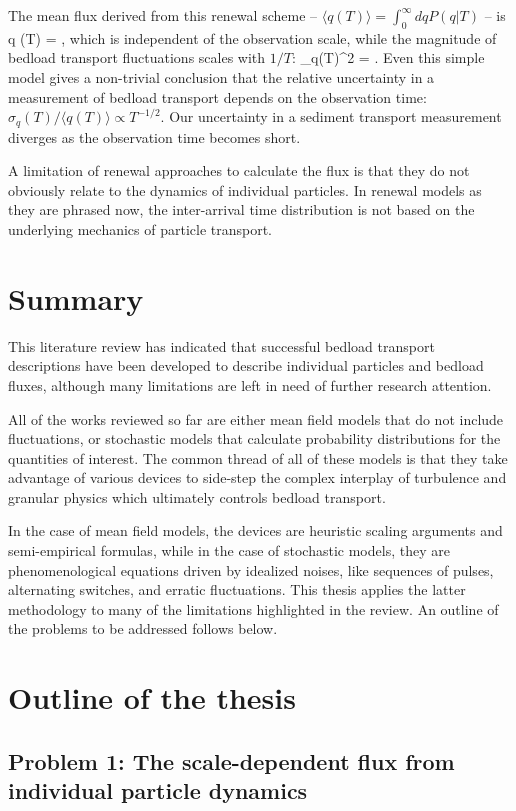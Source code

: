 The mean flux derived from this renewal scheme -- $\langle q (T)\rangle = \int_0^\infty dq P(q|T)$ -- is
\be \langle q (T) \rangle = \Lambda, \ee
which is independent of the observation scale, while the magnitude of bedload transport fluctuations scales with $1/T$: 
\be \sigma_q(T)^2 = .\ee
Even this simple model gives a non-trivial conclusion that the relative uncertainty in a measurement of bedload transport depends on the observation time: $\sigma_q(T)/\langle q(T) \rangle \propto T^{-1/2}.$ Our uncertainty in a sediment transport measurement diverges as the observation time becomes short.

A limitation of renewal approaches to calculate the flux is that they do not obviously relate to the dynamics of individual particles. In renewal models as they are phrased now, the inter-arrival time distribution is not based on the underlying mechanics of particle transport.

\section{Summary}

This literature review has indicated that successful bedload transport descriptions have been developed to describe individual particles and bedload fluxes, although many limitations are left in need of further research attention.

All of the works reviewed so far are either mean field models that do not include fluctuations, or stochastic models that calculate probability distributions for the quantities of interest.
The common thread of all of these models is that they take advantage of various devices to side-step the complex interplay of turbulence and granular physics which ultimately controls bedload transport.

In the case of mean field models, the devices are heuristic scaling arguments and semi-empirical formulas, while in the case of stochastic models, they are phenomenological equations driven by idealized noises, like sequences of pulses, alternating switches, and erratic fluctuations.
This thesis applies the latter methodology to many of the limitations highlighted in the review. An outline of the problems to be addressed follows below.

\section{Outline of the thesis}
\subsection{Problem 1: The scale-dependent flux from individual particle dynamics}

